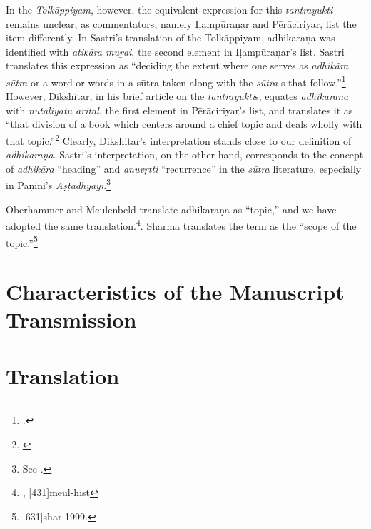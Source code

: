 In the \emph{Tolkāppiyam}, however, the equivalent expression for this \emph{tantrayukti} remains unclear, as commentators, namely Iḷampūraṇar and Pērāciriyar, list the item differently. In Sastri's translation of the Tolkāppiyam, adhikaraṇa was identified with \emph{atikāra muṟai}, the second element in Iḷampūraṇar's list. Sastri translates this expression as “deciding the extent where one serves as \emph{adhikāra sūtra} or a word or words in a sūtra taken along with the \emph{sūtra}-s that follow.”\footnote{\cite[233]{sast-1936}.} However, Dikshitar, in his brief article on the \emph{tantrayukti}s, equates \emph{adhikaraṇa} with \emph{nutaliyatu aṟital}, the first element in Pērāciriyar's list, and translates it as “that division of a book which centers around a chief topic and deals wholly with that topic.”\footnote{\cite[85]{diks-1930}} Clearly, Dikshitar's interpretation stands close to our definition of \emph{adhikaraṇa}. Sastri's interpretation, on the other hand, corresponds to the concept of \emph{adhikāra} “heading” and \emph{anuvṛtti} “recurrence” in the \emph{sūtra} literature, especially in Pāṇini's \emph{Aṣṭādhyāyī}.\footnote{See \cite[111]{chev-2009}.} 

Oberhammer and Meulenbeld translate adhikaraṇa as “topic,” and we have adopted the same translation.\footnote{\cite[601]{ober-1967}, [431]{meul-hist}}. Sharma translates the term as the “scope of the topic.”\footnote{[631]{shar-1999}.}


\section{Characteristics of the Manuscript Transmission}


\newpage
\section{Translation}

